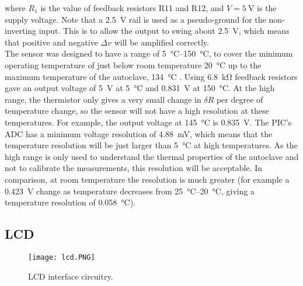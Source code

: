 where $R_1$ is the value of feedback resistors R11 and R12, and $V=\SI{5}{\volt}$ is the supply voltage. Note that a \SI{2.5}{\volt} rail is used as a pseudo-ground for the non-inverting input. This is to allow the output to swing about \SI{2.5}{\volt}, which means that positive and negative $\Delta v$ will be amplified correctly.\\

The sensor was designed to have a range of \SIrange{5}{150}{\celsius}, to cover the minimum operating temperature of just below room temperature \SI{20}{\celsius} up to the maximum temperature of the autoclave, \SI{134}{\celsius} \cite{nhs_autoclave}. Using \SI{6.8}{\kilo\ohm} feedback resistors gave an output voltage of \SI{5}{\volt} at \SI{5}{\celsius} and \SI{0.831}{\volt} at \SI{150}{\celsius}. At the high range, the thermistor only gives a very small change in $\delta R$ per degree of temperature change, so the sensor will not have a high resolution at these temperatures. For example, the output voltage at \SI{145}{\celsius} is \SI{0.835}{\volt}. The PIC's ADC has a minimum voltage resolution of \SI{4.88}{\milli\volt}, which means that the temperature resolution will be just larger than \SI{5}{\celsius} at high temperatures. As the high range is only used to understand the thermal properties of the autoclave and not to calibrate the measurements, this resolution will be acceptable. In comparison, at room temperature the resolution is much greater (for example a \SI{0.423}{\volt} change as temperature decreases from \SIrange{25}{20}{\celsius}, giving a temperature resolution of \SI{0.058}{\celsius}).\\





\subsection{LCD}
\begin{figure}[htbp]
	\centering
	\texttt{[image: lcd.PNG]}
	\caption{LCD interface circuitry.}
	\label{fig: lcd schematic}
\end{figure}

